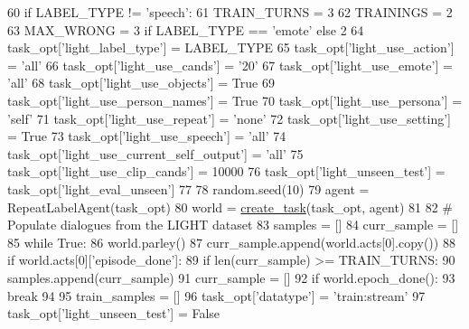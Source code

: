 \begin{DoxyCode}
60     \textcolor{keywordflow}{if} LABEL\_TYPE != \textcolor{stringliteral}{'speech'}:
61         TRAIN\_TURNS = 3
62         TRAININGS = 2
63         MAX\_WRONG = 3 \textcolor{keywordflow}{if} LABEL\_TYPE == \textcolor{stringliteral}{'emote'} \textcolor{keywordflow}{else} 2
64     task\_opt[\textcolor{stringliteral}{'light\_label\_type'}] = LABEL\_TYPE
65     task\_opt[\textcolor{stringliteral}{'light\_use\_action'}] = \textcolor{stringliteral}{'all'}
66     task\_opt[\textcolor{stringliteral}{'light\_use\_cands'}] = \textcolor{stringliteral}{'20'}
67     task\_opt[\textcolor{stringliteral}{'light\_use\_emote'}] = \textcolor{stringliteral}{'all'}
68     task\_opt[\textcolor{stringliteral}{'light\_use\_objects'}] = \textcolor{keyword}{True}
69     task\_opt[\textcolor{stringliteral}{'light\_use\_person\_names'}] = \textcolor{keyword}{True}
70     task\_opt[\textcolor{stringliteral}{'light\_use\_persona'}] = \textcolor{stringliteral}{'self'}
71     task\_opt[\textcolor{stringliteral}{'light\_use\_repeat'}] = \textcolor{stringliteral}{'none'}
72     task\_opt[\textcolor{stringliteral}{'light\_use\_setting'}] = \textcolor{keyword}{True}
73     task\_opt[\textcolor{stringliteral}{'light\_use\_speech'}] = \textcolor{stringliteral}{'all'}
74     task\_opt[\textcolor{stringliteral}{'light\_use\_current\_self\_output'}] = \textcolor{stringliteral}{'all'}
75     task\_opt[\textcolor{stringliteral}{'light\_use\_clip\_cands'}] = 10000
76     task\_opt[\textcolor{stringliteral}{'light\_unseen\_test'}] = task\_opt[\textcolor{stringliteral}{'light\_eval\_unseen'}]
77 
78     random.seed(10)
79     agent = RepeatLabelAgent(task\_opt)
80     world = \hyperlink{namespaceparlai_1_1core_1_1worlds_a11923c10b545c7ecc1b08fe2242d9c2c}{create\_task}(task\_opt, agent)
81 
82     \textcolor{comment}{# Populate dialogues from the LIGHT dataset}
83     samples = []
84     curr\_sample = []
85     \textcolor{keywordflow}{while} \textcolor{keyword}{True}:
86         world.parley()
87         curr\_sample.append(world.acts[0].copy())
88         \textcolor{keywordflow}{if} world.acts[0][\textcolor{stringliteral}{'episode\_done'}]:
89             \textcolor{keywordflow}{if} len(curr\_sample) >= TRAIN\_TURNS:
90                 samples.append(curr\_sample)
91             curr\_sample = []
92         \textcolor{keywordflow}{if} world.epoch\_done():
93             \textcolor{keywordflow}{break}
94 
95     train\_samples = []
96     task\_opt[\textcolor{stringliteral}{'datatype'}] = \textcolor{stringliteral}{'train:stream'}
97     task\_opt[\textcolor{stringliteral}{'light\_unseen\_test'}] = \textcolor{keyword}{False}

\end{DoxyCode}
